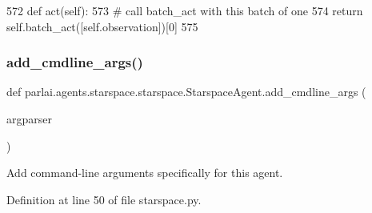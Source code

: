 \begin{DoxyCode}
572     \textcolor{keyword}{def }act(self):
573         \textcolor{comment}{# call batch\_act with this batch of one}
574         \textcolor{keywordflow}{return} self.batch\_act([self.observation])[0]
575 
\end{DoxyCode}
\mbox{\label{classparlai_1_1agents_1_1starspace_1_1starspace_1_1StarspaceAgent_ace1f02a93ef83c9623ab599f9be26d66}} 
\subsubsection{\texorpdfstring{add\+\_\+cmdline\+\_\+args()}{add\_cmdline\_args()}}
{\footnotesize\ttfamily def parlai.\+agents.\+starspace.\+starspace.\+Starspace\+Agent.\+add\+\_\+cmdline\+\_\+args (\begin{DoxyParamCaption}\item[{}]{argparser }\end{DoxyParamCaption})\hspace{0.3cm}{\ttfamily [static]}}

\begin{DoxyVerb}Add command-line arguments specifically for this agent.
\end{DoxyVerb}
 

Definition at line 50 of file starspace.\+py.


